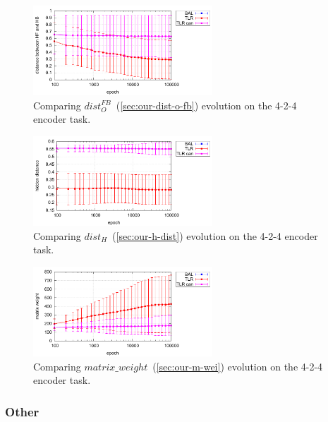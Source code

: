 \begin{figure}[H]
  \centering
  \includegraphics[width=0.6\textwidth]{img/feature-cmp-o-fb-d.pdf}  
   \caption{Comparing $dist_{O}^{FB}$~(\ref{sec:our-dist-o-fb}) evolution on the {4-2-4 encoder} task.}
  \label{fig:results-candidates-o-fb-d}
\end{figure}

\begin{figure}[H]
  \centering
  \includegraphics[width=0.6\textwidth]{img/feature-cmp-h-dist.pdf}  
   \caption{Comparing $dist_{H}$~(\ref{sec:our-h-dist}) evolution on the {4-2-4 encoder} task.}
  \label{fig:results-candidates-h-dist}
\end{figure}

\begin{figure}[H]
  \centering
  \includegraphics[width=0.6\textwidth]{img/feature-cmp-m-wei.pdf}  
   \caption{Comparing $matrix\_weight$~(\ref{sec:our-m-wei}) evolution on the {4-2-4 encoder} task.}
  \label{fig:results-candidates-m-wei}
\end{figure}


\subsubsection{Other}

